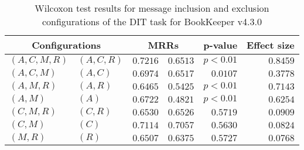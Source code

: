 
\begin{table}
\begin{spacing}{1.2}
\centering
\caption{Wilcoxon test results for message inclusion and exclusion configurations of the DIT task for BookKeeper v4.3.0}
\label{table:versus-wilcox-bookkeeper-dit-message}
\begin{tabular}{ll|rr|rr}
\toprule
      \multicolumn{2}{c|}{Configurations} &          \multicolumn{2}{c|}{MRRs} &       p-value & Effect size \\
\midrule
 $(A,C,M,R)$ &  $(A,C,R)$ & $0.7216$ & $0.6513$ & $p<0.01$ &    $0.8459$ \\
   $(A,C,M)$ &    $(A,C)$ & $0.6974$ & $0.6517$ & $0.0107$ &    $0.3778$ \\
   $(A,M,R)$ &    $(A,R)$ & $0.6465$ & $0.5425$ & $p<0.01$ &    $0.7143$ \\
     $(A,M)$ &      $(A)$ & $0.6722$ & $0.4821$ & $p<0.01$ &    $0.6254$ \\
   $(C,M,R)$ &    $(C,R)$ & $0.6530$ & $0.6526$ & $0.5719$ &    $0.0909$ \\
     $(C,M)$ &      $(C)$ & $0.7114$ & $0.7057$ & $0.5630$ &    $0.0824$ \\
     $(M,R)$ &      $(R)$ & $0.6507$ & $0.6375$ & $0.5727$ &    $0.0768$ \\
\bottomrule
\end{tabular}

\end{spacing}
\end{table}

